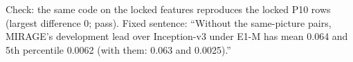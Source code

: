 Check: the same code on the locked features reproduces the locked P10 rows (largest difference 0; pass). Fixed sentence: ``Without the same-picture pairs, MIRAGE's development lead over Inception-v3 under E1-M has mean 0.064 and 5th percentile 0.0062 (with them: 0.063 and 0.0025).''
